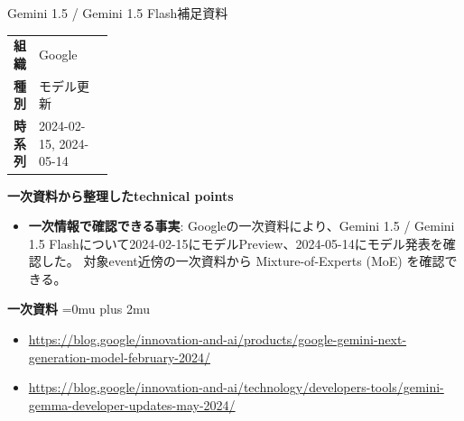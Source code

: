 \begin{technicalnote}{Gemini 1.5 / Gemini 1.5 Flash}{補足資料}
\begingroup
\begin{tabularx}{\linewidth}{@{}>{\bfseries}p{0.22\linewidth}X@{}}
組織 & Google \\
種別 & モデル更新 \\
時系列 & 2024-02-15, 2024-05-14 \\
\end{tabularx}
\smallskip
\begin{minipage}{\linewidth}
{\bfseries 一次資料から整理したtechnical points}
\begin{itemize}[leftmargin=1.5em,itemsep=0.35em]
\item \textbf{一次情報で確認できる事実}: Googleの一次資料により、Gemini 1.5 / Gemini 1.5 Flashについて2024-02-15にモデルPreview、2024-05-14にモデル発表を確認した。 対象event近傍の一次資料から Mixture-of-Experts (MoE) を確認できる。
\end{itemize}
\begin{minipage}{\linewidth}
\begin{samepage}
{\bfseries 一次資料}
\begingroup\sloppy
\Urlmuskip=0mu plus 2mu\relax
\begin{itemize}[leftmargin=1.5em,itemsep=0.25em]
\item {\scriptsize\url{https://blog.google/innovation-and-ai/products/google-gemini-next-generation-model-february-2024/}}
\item {\scriptsize\url{https://blog.google/innovation-and-ai/technology/developers-tools/gemini-gemma-developer-updates-may-2024/}}
\end{itemize}
\endgroup
\end{samepage}
\end{minipage}
\end{minipage}
\endgroup
\end{technicalnote}
\medskip
